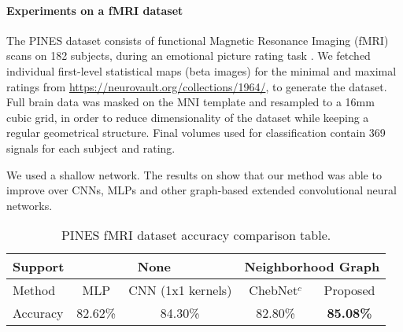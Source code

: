 \paragraph{Experiments on a fMRI dataset}

The PINES dataset consists of functional Magnetic Resonance Imaging (fMRI) scans on 182 subjects, during an emotional picture rating task \citep{chang2015sensitive}. We fetched individual first-level statistical maps (beta images) for the minimal and maximal ratings from \url{https://neurovault.org/collections/1964/}, to generate the dataset. Full brain data was masked on the MNI template and resampled to a 16mm cubic grid, in order to reduce dimensionality of the dataset while keeping a regular geometrical structure. Final volumes used for classification contain 369 signals for each subject and rating. 

We used a shallow network. The results on  show that our method was able to improve over CNNs, MLPs and other graph-based extended convolutional neural networks.

\begin{table}[h!]
\centering
\caption{PINES fMRI dataset accuracy comparison table.}
\label{tab:iaps-table}
\begin{tabular}{|l||c|c||c|c|}
\hline
\multicolumn{1}{|l||}{Support} & \multicolumn{2}{c||}{None} & \multicolumn{2}{c|}{Neighborhood Graph}     \\ \hline
Method                      & MLP & CNN (1x1 kernels)                                & ChebNet$^c$ & Proposed                   \\ \hline
Accuracy                    & 82.62\% & 84.30\%                            & 82.80\%                            & \textbf{85.08\%} \\ \hline
\end{tabular}
\end{table}

